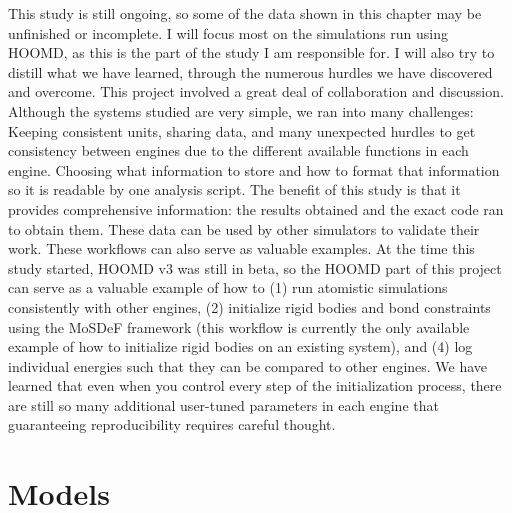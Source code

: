 This study is still ongoing, so some of the data shown in this chapter may be unfinished or incomplete. 
I will focus most on the simulations run using HOOMD, as this is the part of the study I am responsible for.
I will also try to distill what we have learned, through the numerous hurdles we have discovered and overcome. 
This project involved a great deal of collaboration and discussion.
Although the systems studied are very simple, we ran into many challenges:
Keeping consistent units, sharing data, and many unexpected hurdles to get consistency between engines due to the different available functions in each engine. %
Choosing what information to store and how to format that information so it is readable by one analysis script. 
The benefit of this study is that it provides comprehensive information: the results obtained and the exact code ran to obtain them. 
These data can be used by other simulators to validate their work.
These workflows can also serve as valuable examples. 
At the time this study started, HOOMD v3 was still in beta, so the HOOMD part of this project can serve as a valuable example of how to (1) run atomistic simulations consistently with other engines, (2) initialize rigid bodies and bond constraints using the MoSDeF framework (this workflow is currently the only available example of how to initialize rigid bodies on an existing system), and (4) log individual energies such that they can be compared to other engines. 
We have learned that even when you control every step of the initialization process, there are still so many additional user-tuned parameters in each engine that guaranteeing reproducibility requires careful thought.

\section{Models}

